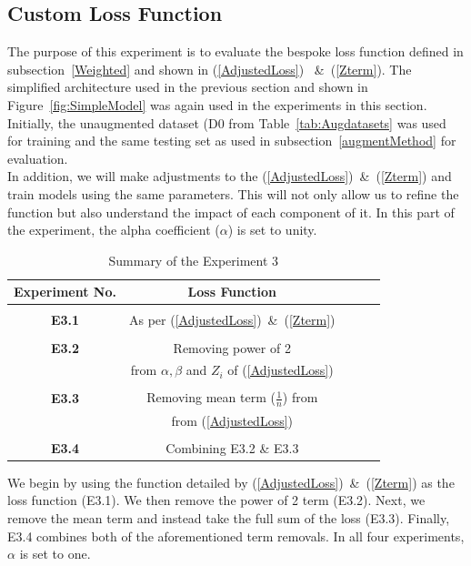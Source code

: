\subsection{Custom Loss Function} \label{lossMethod}

The purpose of this experiment is to evaluate the bespoke loss function defined in subsection~\ref{Weighted} and shown in (\ref{AdjustedLoss}) ~\&~(\ref{Zterm}). 
The simplified architecture used in the previous section and shown in Figure~\ref{fig:SimpleModel} was again used in the experiments in this section. Initially, the unaugmented dataset (D0 from Table~\ref{tab:Augdatasets} was used for training and the same testing set as used in subsection~\ref{augmentMethod} for evaluation. 
\\

\noindent
In addition, we will make adjustments to the (\ref{AdjustedLoss})~\&~(\ref{Zterm}) and train models using the same parameters. This will not only allow us to refine the function but also understand the impact of each component of it. In this part of the experiment, the alpha coefficient ($\alpha$) is set to unity.
\\

\begin{table}[h!]
	 \begin{center}
		
		\begin{tabular}{c|c|c|r|c} %
			\textbf{Experiment No.} & \textbf{Loss Function}  \\
			
			\hline
			& \\
			
			\textbf{E3.1} & As per (\ref{AdjustedLoss})~\&~(\ref{Zterm}) \\ 
			& \\
			\textbf{E3.2} & Removing power of 2  \\  
			
			& from $\alpha, \beta$ and $Z_i$ of (\ref{AdjustedLoss}) \\
			& \\
			\textbf{E3.3} & Removing mean term ($\frac{1}{n}$) from \\  
			& from (\ref{AdjustedLoss}) \\
			& \\
			\textbf{E3.4} & Combining E3.2 \& E3.3 \\
			
		\end{tabular}
		\caption{Summary of the Experiment 3} {We begin by using the function detailed by (\ref{AdjustedLoss})~\&~(\ref{Zterm}) as the loss function (E3.1). We then remove the power of 2 term (E3.2). Next, we remove the mean term and instead take the full sum of the loss (E3.3). Finally, E3.4 combines both of the aforementioned term removals. In all four experiments, $\alpha$ is set to one.}
		\label{tab:Experiment3}
		 \end{center}
\end{table}

